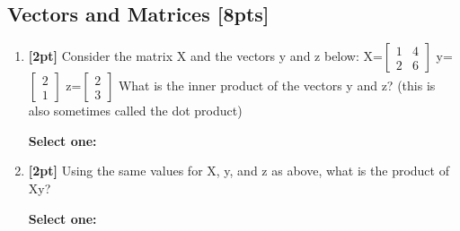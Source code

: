 \documentclass[12pt]{article}
\renewcommand{\circle}{\tikz\draw[black] (0,0) circle (1ex);}
\begin{document}
\subsection{Vectors and Matrices [8pts]}
\begin{enumerate}
    \item \textbf{[2pt]} Consider the matrix X and the vectors y and z below: X=$\begin{bmatrix} 1 & 4 \\ 2 & 6 \end{bmatrix}$ y=$\begin{bmatrix} 2 \\ 1 \end{bmatrix}$ z=$\begin{bmatrix} 2 \\ 3 \end{bmatrix}$ What is the inner product of the vectors y and z? (this is also sometimes called the dot product)

    \textbf{Select one:}


    \item \textbf{[2pt]} Using the same values for X, y, and z as above, what is the product of Xy?

    \textbf{Select one:}


\end{enumerate}
\end{document}
